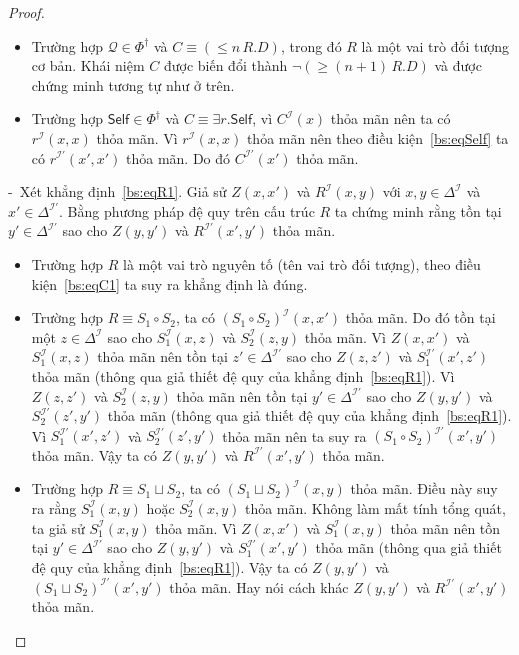 \documentclass[12pt,a4paper,twoside]{report}
\newcommand{\mI}		{\mathcal{I}}
\newcommand{\mQ}		{\mathcal{Q}}
\newcommand{\PhiDag}	{\Phi^\dag}
\newcommand{\Self}		{\mathsf{Self}}
\newcommand{\semiItem}	{\mbox{- }}
\newcommand{\mor}		{\sqcup}
\newcommand{\E}			{\exists}
\theoremstyle{definition}
\begin{document}
\begin{proof}
\begin{itemize}
  \item Trường hợp $\mQ \in \PhiDag$ và $C \equiv (\leq n\,R.D)$, trong đó $R$ là một vai trò đối tượng cơ bản. Khái niệm $C$ được biến đổi thành $\neg (\geq (n+1)\,R.D)$ và được chứng minh tương tự như ở trên.
  
  \item Trường hợp $\Self \in \PhiDag$ và $C \equiv \E r.\Self$, vì $C^\mI(x)$ thỏa mãn nên ta có $r^\mI(x,x)$ thỏa mãn. Vì $r^\mI(x,x)$ thỏa mãn nên theo điều kiện~\eqref{bs:eqSelf} ta có $r^{\mI'}(x',x')$ thỏa mãn. Do đó $C^{\mI'}(x')$ thỏa mãn.
\end{itemize}

\semiItem Xét khẳng định~\eqref{bs:eqR1}. Giả sử $Z(x,x')$ và $R^\mI(x,y)$ với $x, y \in \Delta^\mI$ và $x' \in \Delta^{\mI'}$. Bằng phương pháp đệ quy trên cấu trúc $R$ ta chứng minh rằng tồn tại $y' \in \Delta^{\mI'}$ sao cho $Z(y,y')$ và $R^{\mI'}(x',y')$ thỏa mãn.
\begin{itemize}
  \item Trường hợp $R$ là một vai trò nguyên tố (tên vai trò đối tượng), theo điều kiện~\eqref{bs:eqC1} ta suy ra khẳng định là đúng.

  \item Trường hợp $R \equiv S_1 \circ S_2$, ta có $(S_1 \circ S_2)^\mI(x,x')$ thỏa mãn. Do đó tồn tại một $z \in \Delta^\mI$ sao cho $S_1^\mI(x,z)$ và $S_2^\mI(z,y)$ thỏa mãn. Vì $Z(x,x')$ và $S_1^\mI(x,z)$ thỏa mãn nên tồn tại $z' \in \Delta^{\mI'}$ sao cho $Z(z,z')$ và $S_1^{\mI'}(x',z')$ thỏa mãn (thông qua giả thiết đệ quy của khẳng định~\eqref{bs:eqR1}). Vì $Z(z,z')$ và $S_2^\mI(z,y)$ thỏa mãn nên tồn tại $y' \in \Delta^{\mI'}$ sao cho $Z(y,y')$ và $S_2^{\mI'}(z',y')$ thỏa mãn (thông qua giả thiết đệ quy của khẳng định~\eqref{bs:eqR1}). Vì $S_1^{\mI'}(x',z')$ và $S_2^{\mI'}(z',y')$ thỏa mãn nên ta suy ra $(S_1 \circ S_2)^{\mI'}(x',y')$ thỏa mãn. Vậy ta có $Z(y,y')$ và $R^{\mI'}(x',y')$ thỏa mãn.

  \item Trường hợp $R \equiv S_1 \mor S_2$, ta có $(S_1 \mor S_2)^\mI(x,y)$ thỏa mãn. Điều này suy ra rằng $S_1^\mI(x,y)$ hoặc $S_2^\mI(x,y)$ thỏa mãn. Không làm mất tính tổng quát, ta giả sử $S_1^\mI(x,y)$ thỏa mãn. Vì $Z(x,x')$ và $S_1^\mI(x,y)$ thỏa mãn nên tồn tại $y' \in \Delta^{\mI'}$ sao cho $Z(y,y')$ và $S_1^{\mI'}(x',y')$ thỏa mãn (thông qua giả thiết đệ quy của khẳng định~\eqref{bs:eqR1}). Vậy ta có $Z(y,y')$ và $(S_1 \mor S_2)^{\mI'}(x',y')$ thỏa mãn. Hay nói cách khác $Z(y,y')$ và $R^{\mI'}(x',y')$ thỏa mãn.


\end{itemize}
\end{proof}
\end{document}
